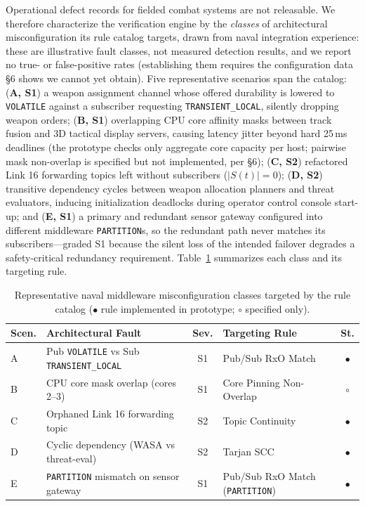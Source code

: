 \documentclass[sigconf,9pt]{acmart}
\begin{document}
Operational defect records for fielded combat systems are not releasable. We therefore characterize the verification engine by the \emph{classes} of architectural misconfiguration its rule catalog targets, drawn from naval integration experience: these are illustrative fault classes, not measured detection results, and we report no true- or false-positive rates (establishing them requires the configuration data \S6 shows we cannot yet obtain). Five representative scenarios span the catalog: (\textbf{A, S1}) a weapon assignment channel whose offered durability is lowered to \texttt{VOLATILE} against a subscriber requesting \texttt{TRANSIENT\_LOCAL}, silently dropping weapon orders; (\textbf{B, S1}) overlapping CPU core affinity masks between track fusion and 3D tactical display servers, causing latency jitter beyond hard 25\,ms deadlines (the prototype checks only aggregate core capacity per host; pairwise mask non-overlap is specified but not implemented, per \S6); (\textbf{C, S2}) refactored Link 16 forwarding topics left without subscribers ($|S(t)|=0$); (\textbf{D, S2}) transitive dependency cycles between weapon allocation planners and threat evaluators, inducing initialization deadlocks during operator control console start-up; and (\textbf{E, S1}) a primary and redundant sensor gateway configured into different middleware \texttt{PARTITION}s, so the redundant path never matches its subscribers---graded S1 because the silent loss of the intended failover degrades a safety-critical redundancy requirement. Table~\ref{tab:scenarios} summarizes each class and its targeting rule.

\begin{table}[t]
\centering
\caption{Representative naval middleware misconfiguration classes targeted by the rule catalog ($\bullet$ rule implemented in prototype; $\circ$ specified only).}
\label{tab:scenarios}
\small
\begin{tabularx}{\columnwidth}{l X c X c}
\toprule
\textbf{Scen.} & \textbf{Architectural Fault} & \textbf{Sev.} & \textbf{Targeting Rule} & \textbf{St.} \\
\midrule
A & Pub \texttt{VOLATILE} vs Sub \texttt{TRANSIENT\_LOCAL} & S1 & Pub/Sub RxO Match & $\bullet$ \\
B & CPU core mask overlap (cores 2--3) & S1 & Core Pinning Non-Overlap & $\circ$ \\
C & Orphaned Link 16 forwarding topic & S2 & Topic Continuity & $\bullet$ \\
D & Cyclic dependency (WASA vs threat-eval) & S2 & Tarjan SCC & $\bullet$ \\
E & \texttt{PARTITION} mismatch on sensor gateway & S1 & Pub/Sub RxO Match (\texttt{PARTITION}) & $\bullet$ \\
\bottomrule
\end{tabularx}
\end{table}
\end{document}

